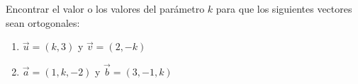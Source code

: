 Encontrar el valor o los valores del parámetro $k$ para que los siguientes vectores sean ortogonales:
\begin{enumerate}
    \item $\vec{u} = (k, 3)$ y $\vec{v} = (2, -k)$
    \item $\vec{a} = (1, k, -2)$ y $\vec{b} = (3, -1, k)$
\end{enumerate}
